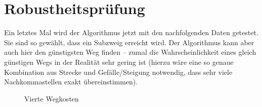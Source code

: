 \section{Robustheitsprüfung}
\label{sec:robustheitsprüfung}

Ein letztes Mal wird der Algorithmus jetzt mit den nachfolgenden Daten getestet. Sie sind so gewählt, dass ein Subzweig erreicht wird. Der Algorithmus kann aber auch hier den günstigsten Weg finden -- zumal die Wahrscheinlichkeit eines gleich günstigen Wegs in der Realität sehr gering ist (hierzu wäre eine so genaue Kombination aus Strecke und Gefälle/Steigung notwendig, dass sehr viele Nachkommastellen exakt übereinstimmen).



\begin{figure}[H]
	\centering
	\caption{Vierte Wegkosten
		\label{fig:vierte-wegkosten}}
\end{figure}


